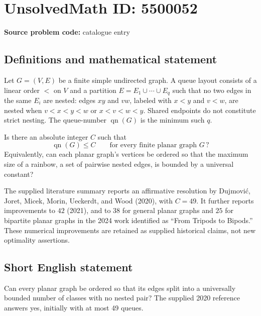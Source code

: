 \documentclass[11pt]{article}
\begin{document}
\section*{UnsolvedMath ID: 5500052}
\textbf{Source problem code:} catalogue entry
\subsection{Definitions and mathematical statement}
Let $G=(V,E)$ be a finite simple undirected graph. A queue layout consists of a linear order $<$ on $V$ and a partition $E=E_1\cup\cdots\cup E_q$ such that no two edges in the same $E_i$ are nested: edges $xy$ and $vw$, labeled with $x<y$ and $v<w$, are nested when $v<x<y<w$ or $x<v<w<y$. Shared endpoints do not constitute strict nesting. The queue-number $\operatorname{qn}(G)$ is the minimum such $q$.

Is there an absolute integer $C$ such that
\[
\operatorname{qn}(G)\leq C\qquad\text{for every finite planar graph }G\,?
\]
Equivalently, can each planar graph's vertices be ordered so that the maximum size of a rainbow, a set of pairwise nested edges, is bounded by a universal constant?

The supplied literature summary reports an affirmative resolution by Dujmović, Joret, Micek, Morin, Ueckerdt, and Wood (2020), with $C=49$. It further reports improvements to $42$ (2021), and to $38$ for general planar graphs and $25$ for bipartite planar graphs in the 2024 work identified as ``From Tripods to Bipods.'' These numerical improvements are retained as supplied historical claims, not new optimality assertions.
\subsection{Short English statement}
Can every planar graph be ordered so that its edges split into a universally bounded number of classes with no nested pair? The supplied 2020 reference answers yes, initially with at most 49 queues.
\end{document}
